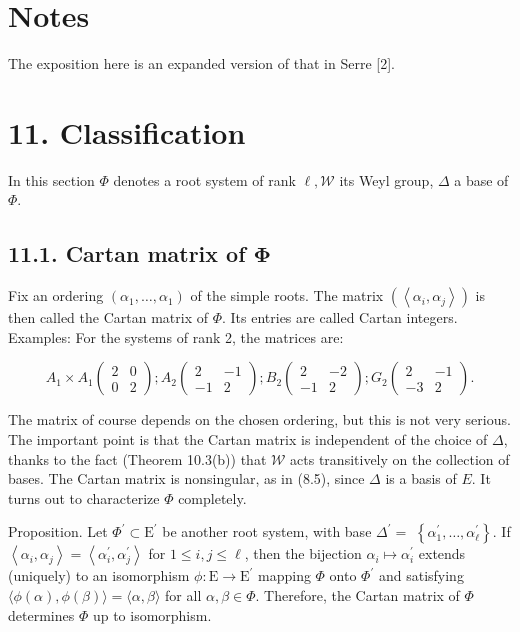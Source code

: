 \documentclass[10pt]{article}
\begin{document}
\section*{Notes}
The exposition here is an expanded version of that in Serre [2].

\section*{11. Classification}
In this section $\Phi$ denotes a root system of rank $\ell, \mathscr{W}$ its Weyl group, $\Delta$ a base of $\Phi$.

\subsection*{11.1. Cartan matrix of $\mathbf{\Phi}$}
Fix an ordering $\left(\alpha_{1}, \ldots, \alpha_{1}\right)$ of the simple roots. The matrix $\left(\left\langle\alpha_{i}, \alpha_{j}\right\rangle\right)$ is then called the Cartan matrix of $\Phi$. Its entries are called Cartan integers. Examples: For the systems of rank 2, the matrices are:

$$
A_{1} \times A_{1}\left(\begin{array}{ll}
2 & 0 \\
0 & 2
\end{array}\right) ; A_{2}\left(\begin{array}{rr}
2 & -1 \\
-1 & 2
\end{array}\right) ; B_{2}\left(\begin{array}{rr}
2 & -2 \\
-1 & 2
\end{array}\right) ; G_{2}\left(\begin{array}{rr}
2 & -1 \\
-3 & 2
\end{array}\right) .
$$

The matrix of course depends on the chosen ordering, but this is not very serious. The important point is that the Cartan matrix is independent of the choice of $\Delta$, thanks to the fact (Theorem 10.3(b)) that $\mathscr{W}$ acts transitively on the collection of bases. The Cartan matrix is nonsingular, as in (8.5), since $\Delta$ is a basis of $E$. It turns out to characterize $\Phi$ completely.

Proposition. Let $\Phi^{\prime} \subset \mathrm{E}^{\prime}$ be another root system, with base $\Delta^{\prime}=$ $\left\{\alpha_{1}^{\prime}, \ldots, \alpha_{\ell}^{\prime}\right\}$. If $\left\langle\alpha_{i}, \alpha_{j}\right\rangle=\left\langle\alpha_{i}^{\prime}, \alpha_{j}^{\prime}\right\rangle$ for $1 \leq i, j \leq \ell$, then the bijection $\alpha_{i} \mapsto \alpha_{i}^{\prime}$ extends (uniquely) to an isomorphism $\phi: \mathrm{E} \rightarrow \mathrm{E}^{\prime}$ mapping $\Phi$ onto $\Phi^{\prime}$ and satisfying $\langle\phi(\alpha), \phi(\beta)\rangle=\langle\alpha, \beta\rangle$ for all $\alpha, \beta \in \Phi$. Therefore, the Cartan matrix of $\Phi$ determines $\Phi$ up to isomorphism.
\end{document}
